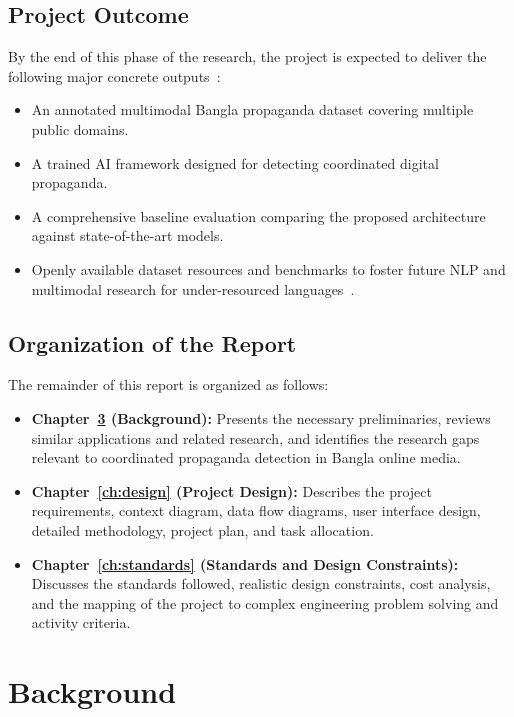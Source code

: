\documentclass[12pt,a4paper]{report}
\begin{document}
\section{Project Outcome}
By the end of this phase of the research, the project is expected to deliver the
following major concrete outputs~\cite{hossain2020}:
\begin{itemize}
  \item An annotated multimodal Bangla propaganda dataset covering multiple public
        domains.
  \item A trained AI framework designed for detecting coordinated digital
        propaganda.
  \item A comprehensive baseline evaluation comparing the proposed architecture
        against state-of-the-art models.
  \item Openly available dataset resources and benchmarks to foster future NLP and
        multimodal research for under-resourced languages~\cite{hristakieva2022}.
\end{itemize}

\section{Organization of the Report}
The remainder of this report is organized as follows:
\begin{itemize}
  \item \textbf{Chapter~\ref{ch:background} (Background):} Presents the necessary
        preliminaries, reviews similar applications and related research, and
        identifies the research gaps relevant to coordinated propaganda detection
        in Bangla online media.
  \item \textbf{Chapter~\ref{ch:design} (Project Design):} Describes the project
        requirements, context diagram, data flow diagrams, user interface design,
        detailed methodology, project plan, and task allocation.
  \item \textbf{Chapter~\ref{ch:standards} (Standards and Design Constraints):}
        Discusses the standards followed, realistic design constraints, cost
        analysis, and the mapping of the project to complex engineering problem
        solving and activity criteria.
\end{itemize}

\chapter{Background}
\label{ch:background}
\end{document}
